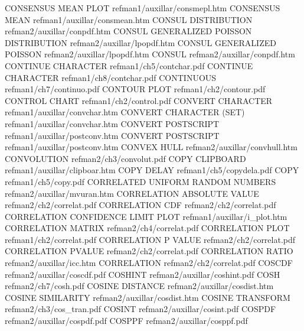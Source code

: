 CONSENSUS MEAN PLOT                     refman1/auxillar/consmepl.htm
CONSENSUS MEAN                          refman1/auxillar/consmean.htm
CONSUL DISTRIBUTION                     refman2/auxillar/conpdf.htm
CONSUL GENERALIZED POISSON DISTRIBUTION refman2/auxillar/lpopdf.htm
CONSUL GENERALIZED POISSON              refman2/auxillar/lpopdf.htm
CONSUL                                  refman2/auxillar/conpdf.htm
CONTINUE CHARACTER                      refman1/ch5/contchar.pdf
CONTINUE CHARACTER                      refman1/ch8/contchar.pdf
CONTINUOUS                              refman1/ch7/continuo.pdf
CONTOUR PLOT                            refman1/ch2/contour.pdf
CONTROL CHART                           refman1/ch2/control.pdf
CONVERT CHARACTER                       refman1/auxillar/convchar.htm
CONVERT CHARACTER (SET)                 refman1/auxillar/convchar.htm
CONVERT POSTSCRIPT                      refman1/auxillar/postconv.htm
CONVERT POSTSCRIPT                      refman1/auxillar/postconv.htm
CONVEX HULL                             refman2/auxillar/convhull.htm
CONVOLUTION                             refman2/ch3/convolut.pdf
COPY CLIPBOARD                          refman1/auxillar/clipboar.htm
COPY DELAY                              refman1/ch5/copydela.pdf
COPY                                    refman1/ch5/copy.pdf
CORRELATED UNIFORM RANDOM NUMBERS       refman2/auxillar/mvuran.htm
CORRELATION ABSOLUTE VALUE              refman2/ch2/correlat.pdf
CORRELATION CDF                         refman2/ch2/correlat.pdf
CORRELATION CONFIDENCE LIMIT PLOT       refman1/auxillar/i_plot.htm
CORRELATION MATRIX                      refman2/ch4/correlat.pdf
CORRELATION PLOT                        refman1/ch2/correlat.pdf
CORRELATION P VALUE                     refman2/ch2/correlat.pdf
CORRELATION PVALUE                      refman2/ch2/correlat.pdf
CORRELATION RATIO                       refman2/auxillar/icc.htm
CORRELATION                             refman2/ch2/correlat.pdf
COSCDF                                  refman2/auxillar/coscdf.pdf
COSHINT                                 refman2/auxillar/coshint.pdf
COSH                                    refman2/ch7/cosh.pdf
COSINE DISTANCE                         refman2/auxillar/cosdist.htm
COSINE SIMILARITY                       refman2/auxillar/cosdist.htm
COSINE TRANSFORM                        refman2/ch3/cos_tran.pdf
COSINT                                  refman2/auxillar/cosint.pdf
COSPDF                                  refman2/auxillar/cospdf.pdf
COSPPF                                  refman2/auxillar/cosppf.pdf
